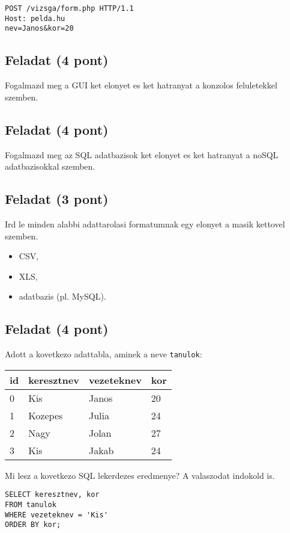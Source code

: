 \documentclass{article}
\let\l\lstinline
\begin{document}
\begin{lstlisting}[language=HTTP kerelem]
POST /vizsga/form.php HTTP/1.1
Host: pelda.hu
nev=Janos&kor=20
\end{lstlisting}

\subsection{Feladat  (4 pont)}

Fogalmazd meg a GUI ket elonyet es ket hatranyat a konzolos feluletekkel szemben.

\subsection{Feladat  (4 pont)}

Fogalmazd meg az SQL adatbazisok ket elonyet es ket hatranyat a noSQL adatbazisokkal szemben.

\subsection{Feladat (3 pont)}

Ird le minden alabbi adattarolasi formatumnak egy elonyet a masik kettovel szemben.

\begin{itemize}
\item CSV,
\item XLS,
\item adatbazis (pl. MySQL).
\end{itemize}

\newpage

\subsection{Feladat (4 pont)}

Adott a kovetkezo adattabla, aminek a neve \l{tanulok}:

\begin{table}[H]
    \begin{tabular}{|l|l|l|l|}
        \hline
        \textbf{id} & \textbf{keresztnev} & \textbf{vezeteknev} & \textbf{kor} \\ \hline
        0           & Kis                 & Janos               & 20           \\ \hline
        1           & Kozepes             & Julia               & 24           \\ \hline
        2           & Nagy                & Jolan               & 27           \\ \hline
        3           & Kis                 & Jakab               & 24           \\ \hline
    \end{tabular}
\end{table}

Mi lesz a kovetkezo SQL lekerdezes eredmenye? A valaszodat indokold is.

\begin{lstlisting}[language=SQL lekerdezes]
SELECT keresztnev, kor
FROM tanulok
WHERE vezeteknev = 'Kis'
ORDER BY kor;
\end{lstlisting}
\end{document}
